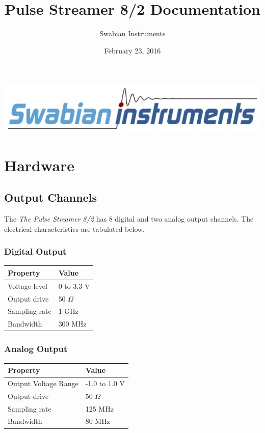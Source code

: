 \documentclass[letterpaper,10pt,english]{sphinxmanual}
\title{Pulse Streamer 8/2 Documentation}
\date{February 23, 2016}
\author{Swabian Instruments}
\begin{document}
\maketitle
\tableofcontents
{}\label{index::doc}
{\hfill\includegraphics[width=0.900\linewidth]{logo_as_paths.png}\hfill}




\chapter{Hardware}
\label{sections/hardware:hardware}\label{sections/hardware::doc}\label{sections/hardware:welcome-to-pulse-streamer-s-documentation}

\section{Output Channels}
\label{sections/hardware:output-channels}
The \emph{The Pulse Streamer 8/2} has 8 digital and two analog output channels.
The electrical characteristics are tabulated below.


\subsection{Digital Output}
\label{sections/hardware:digital-output}
\begin{tabulary}{\linewidth}{|L|L|}
\hline
\textsf{\relax 
Property
} & \textsf{\relax 
Value
}\\
\hline
Voltage level
 & 
0 to 3.3 V
\\

Output drive
 & 
50 \(\Omega\)
\\

Sampling rate
 & 
1 GHz
\\

Bandwidth
 & 
300 MHz
\\
\hline\end{tabulary}



\subsection{Analog Output}
\label{sections/hardware:analog-output}
\begin{tabulary}{\linewidth}{|L|L|}
\hline
\textsf{\relax 
Property
} & \textsf{\relax 
Value
}\\
\hline
Output Voltage Range
 & 
-1.0 to 1.0 V
\\

Output drive
 & 
50 \(\Omega\)
\\

Sampling rate
 & 
125 MHz
\\

Bandwidth
 & 
80 MHz
\\
\hline\end{tabulary}
\end{document}
